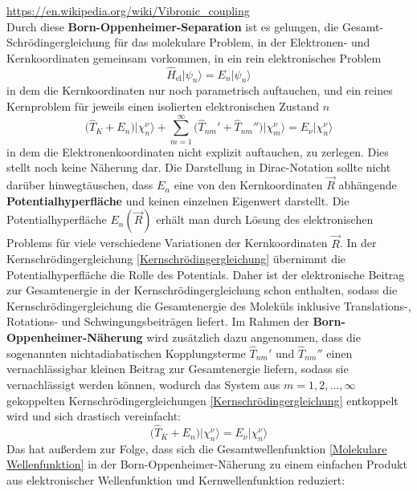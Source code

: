 \documentclass[9pt]{report}
\begin{document}
\url{https://en.wikipedia.org/wiki/Vibronic_coupling}\\
Durch diese \textbf{Born-Oppenheimer-Separation} ist es gelungen, die Gesamt-Schrödingergleichung für das molekulare Problem, in der Elektronen- und Kernkoordinaten gemeinsam vorkommen, in ein rein elektronisches Problem
\begin{equation}
\hat{H}_{\mathrm{el}}\big|\psi_{n}\big\rangle = E_{n}\big|\psi_{n}\big\rangle
\end{equation}
in dem die Kernkoordinaten nur noch parametrisch auftauchen, und ein reines Kernproblem für jeweils einen isolierten elektronischen Zustand $n$
\begin{equation}
\big(\hat{T}_{K}+E_{n}\big)\big|\chi_{n}^{\nu}\big\rangle +\sum_{m=1}^{\infty}\big(\hat{T}_{nm}'+\hat{T}_{nm}''\big)\big|\chi_{m}^{\nu}\big\rangle = E_{\nu}\big|\chi_{n}^{\nu}\big\rangle\label{Kernschrödingergleichung}
\end{equation}
in dem die Elektronenkoordinaten nicht explizit auftauchen, zu zerlegen. Dies stellt noch keine Näherung dar. Die Darstellung in Dirac-Notation sollte nicht darüber hinwegtäuschen, dass $E_{n}$ eine von den Kernkoordinaten $\vec{R}$ abhängende \textbf{Potentialhyperfläche} und keinen einzelnen Eigenwert darstellt. Die Potentialhyperfläche $E_{n}(\vec{R})$ erhält man durch Lösung des elektronischen Problems für viele verschiedene Variationen der Kernkoordinaten $\vec{R}$. In der Kernschrödingergleichung \eqref{Kernschrödingergleichung} übernimmt die Potentialhyperfläche die Rolle des Potentials. Daher ist der elektronische Beitrag zur Gesamtenergie in der Kernschrödingergleichung schon enthalten, sodass die Kernschrödingergleichung die Gesamtenergie des Moleküls inklusive Translations-, Rotations- und Schwingungsbeiträgen liefert. Im Rahmen der \textbf{Born-Oppenheimer-Näherung} wird zusätzlich dazu angenommen, dass die sogenannten nichtadiabatischen Kopplungsterme $\hat{T}_{nm}'$ und $\hat{T}_{nm}''$ einen vernachlässigbar kleinen Beitrag zur Gesamtenergie liefern, sodass sie vernachlässigt werden können, wodurch das System aus $m=1,2,...,\infty$ gekoppelten Kernschrödingergleichungen \eqref{Kernschrödingergleichung} entkoppelt wird und sich drastisch vereinfacht:
\begin{equation}
\big(\hat{T}_{K}+E_{n}\big)\big|\chi_{n}^{\nu}\big\rangle = E_{\nu}\big|\chi_{n}^{\nu}\big\rangle
\end{equation}
Das hat außerdem zur Folge, dass sich die Gesamtwellenfunktion \eqref{Molekulare Wellenfunktion} in der Born-Oppenheimer-Näherung zu einem einfachen Produkt aus elektronischer Wellenfunktion und Kernwellenfunktion reduziert:
\end{document}
